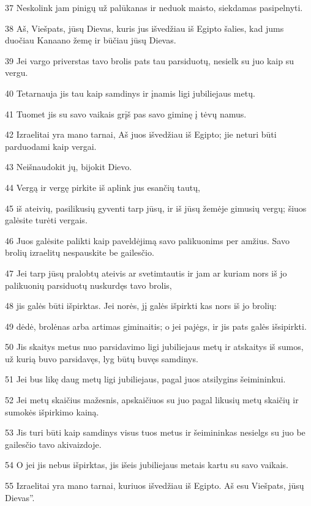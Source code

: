 \par 37 Neskolink jam pinigų už palūkanas ir neduok maisto, siekdamas pasipelnyti. 
\par 38 Aš, Viešpats, jūsų Dievas, kuris jus išvedžiau iš Egipto šalies, kad jums duočiau Kanaano žemę ir būčiau jūsų Dievas. 
\par 39 Jei vargo priverstas tavo brolis pats tau parsiduotų, nesielk su juo kaip su vergu. 
\par 40 Tetarnauja jis tau kaip samdinys ir įnamis ligi jubiliejaus metų. 
\par 41 Tuomet jis su savo vaikais grįš pas savo giminę į tėvų namus. 
\par 42 Izraelitai yra mano tarnai, Aš juos išvedžiau iš Egipto; jie neturi būti parduodami kaip vergai. 
\par 43 Neišnaudokit jų, bijokit Dievo. 
\par 44 Vergą ir vergę pirkite iš aplink jus esančių tautų, 
\par 45 iš ateivių, pasilikusių gyventi tarp jūsų, ir iš jūsų žemėje gimusių vergų; šiuos galėsite turėti vergais. 
\par 46 Juos galėsite palikti kaip paveldėjimą savo palikuonims per amžius. Savo brolių izraelitų nespauskite be gailesčio. 
\par 47 Jei tarp jūsų pralobtų ateivis ar svetimtautis ir jam ar kuriam nors iš jo palikuonių parsiduotų nuskurdęs tavo brolis, 
\par 48 jis galės būti išpirktas. Jei norės, jį galės išpirkti kas nors iš jo brolių: 
\par 49 dėdė, brolėnas arba artimas giminaitis; o jei pajėgs, ir jis pats galės išsipirkti. 
\par 50 Jis skaitys metus nuo parsidavimo ligi jubiliejaus metų ir atskaitys iš sumos, už kurią buvo parsidavęs, lyg būtų buvęs samdinys. 
\par 51 Jei bus likę daug metų ligi jubiliejaus, pagal juos atsilygins šeimininkui. 
\par 52 Jei metų skaičius mažesnis, apskaičiuos su juo pagal likusių metų skaičių ir sumokės išpirkimo kainą. 
\par 53 Jis turi būti kaip samdinys visus tuos metus ir šeimininkas nesielgs su juo be gailesčio tavo akivaizdoje. 
\par 54 O jei jis nebus išpirktas, jis išeis jubiliejaus metais kartu su savo vaikais. 
\par 55 Izraelitai yra mano tarnai, kuriuos išvedžiau iš Egipto. Aš esu Viešpats, jūsų Dievas”.



